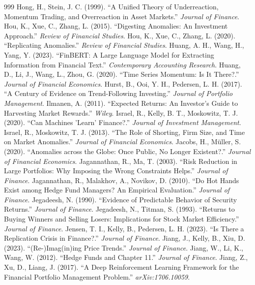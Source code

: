 \begin{thebibliography}{999}
 Hong, H., Stein, J. C. (1999). ``A Unified Theory of Underreaction, Momentum Trading, and Overreaction in Asset Markets.'' \textit{Journal of Finance}.
 Hou, K., Xue, C., Zhang, L. (2015). ``Digesting Anomalies: An Investment Approach.'' \textit{Review of Financial Studies}.
 Hou, K., Xue, C., Zhang, L. (2020). ``Replicating Anomalies.'' \textit{Review of Financial Studies}.
 Huang, A. H., Wang, H., Yang, Y. (2023). ``FinBERT: A Large Language Model for Extracting Information from Financial Text.'' \textit{Contemporary Accounting Research}.
 Huang, D., Li, J., Wang, L., Zhou, G. (2020). ``Time Series Momentum: Is It There?.'' \textit{Journal of Financial Economics}.
 Hurst, B., Ooi, Y. H., Pedersen, L. H. (2017). ``A Century of Evidence on Trend-Following Investing.'' \textit{Journal of Portfolio Management}.
 Ilmanen, A. (2011). ``Expected Returns: An Investor's Guide to Harvesting Market Rewards.'' \textit{Wiley}.
 Israel, R., Kelly, B. T., Moskowitz, T. J. (2020). ``Can Machines 'Learn' Finance?.'' \textit{Journal of Investment Management}.
 Israel, R., Moskowitz, T. J. (2013). ``The Role of Shorting, Firm Size, and Time on Market Anomalies.'' \textit{Journal of Financial Economics}.
 Jacobs, H., Müller, S. (2020). ``Anomalies across the Globe: Once Public, No Longer Existent?.'' \textit{Journal of Financial Economics}.
 Jagannathan, R., Ma, T. (2003). ``Risk Reduction in Large Portfolios: Why Imposing the Wrong Constraints Helps.'' \textit{Journal of Finance}.
 Jagannathan, R., Malakhov, A., Novikov, D. (2010). ``Do Hot Hands Exist among Hedge Fund Managers? An Empirical Evaluation.'' \textit{Journal of Finance}.
 Jegadeesh, N. (1990). ``Evidence of Predictable Behavior of Security Returns.'' \textit{Journal of Finance}.
 Jegadeesh, N., Titman, S. (1993). ``Returns to Buying Winners and Selling Losers: Implications for Stock Market Efficiency.'' \textit{Journal of Finance}.
 Jensen, T. I., Kelly, B., Pedersen, L. H. (2023). ``Is There a Replication Crisis in Finance?.'' \textit{Journal of Finance}.
 Jiang, J., Kelly, B., Xiu, D. (2023). ``(Re-)Imag(in)ing Price Trends.'' \textit{Journal of Finance}.
 Jiang, W., Li, K., Wang, W. (2012). ``Hedge Funds and Chapter 11.'' \textit{Journal of Finance}.
 Jiang, Z., Xu, D., Liang, J. (2017). ``A Deep Reinforcement Learning Framework for the Financial Portfolio Management Problem.'' \textit{arXiv:1706.10059}.

\end{thebibliography}
